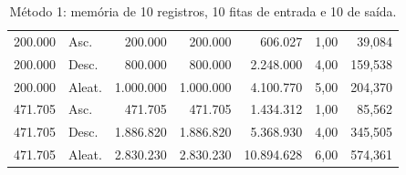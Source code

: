 \documentclass{article}
\begin{document}
\begin{table}[!htb]
\begin{tabular}{|r|l|r|r|r|r|r|}
        200.000  & Asc.   &    200.000 &    200.000 &     606.027 &  1,00 &    39,084 \\
        200.000  & Desc.  &    800.000 &    800.000 &   2.248.000 &  4,00 &   159,538 \\
        200.000  & Aleat. &  1.000.000 &  1.000.000 &   4.100.770 &  5,00 &   204,370 \\\hline
        471.705  & Asc.   &    471.705 &    471.705 &   1.434.312 &  1,00 &    85,562 \\
        471.705  & Desc.  &  1.886.820 &  1.886.820 &   5.368.930 &  4,00 &   345,505 \\
        471.705  & Aleat. &  2.830.230 &  2.830.230 &  10.894.628 &  6,00 &   574,361 \\\hline
        \hline
    \end{tabular}
    \caption{\label{tab:m1}Método 1: memória de 10 registros, 10 fitas de entrada e 10 de saída.}
\end{table}
\end{document}
